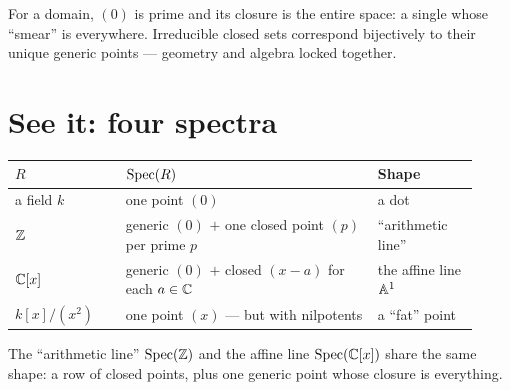 For a domain, $(0)$ is prime and its closure is the entire space: a single
 whose ``smear'' is everywhere.
Irreducible closed sets correspond bijectively to their unique generic points
--- geometry and algebra locked together.

\section{See it: four spectra}

\begin{center}
\begin{tabular}{@{}L{0.22\linewidth} L{0.50\linewidth} L{0.20\linewidth}@{}}
\toprule
$R$ & $\Spec(R)$ & \textbf{Shape} \\
\midrule
a field $k$ & one point $(0)$ & a dot \\
$\ZZ$ & generic $(0)$ $+$ one closed point $(p)$ per prime $p$ & ``arithmetic
line'' \\
$\CC[x]$ & generic $(0)$ $+$ closed $(x-a)$ for each $a\in\CC$ & the affine line
$\AA^1$ \\
$k[x]/(x^2)$ & one point $(x)$ --- but with nilpotents & a ``fat'' point \\
\bottomrule
\end{tabular}
\end{center}

\medskip

\noindent The ``arithmetic line'' $\Spec(\ZZ)$ and the affine line
$\Spec(\CC[x])$ share the same shape: a row of closed points, plus one generic
point whose closure is everything.

\begin{center}
\end{center}

